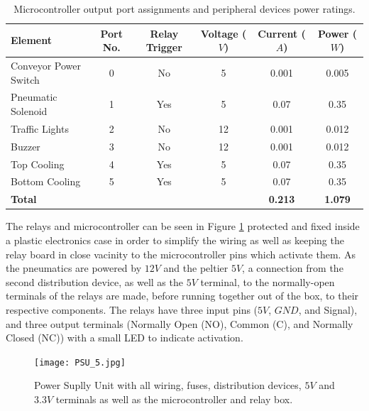 \documentclass[fleqn,twoside]{article}
\begin{document}
\renewcommand{\arraystretch}{0.8}%
\begin{table}[h]
	\caption{Microcontroller output port assignments and peripheral devices power ratings.}
	\label{tab:micro_pinout_out}
	\begin{tabularx}{\linewidth}{Xccccc}
		\toprule
		\textbf{Element}  & \textbf{Port No.}  & \textbf{Relay Trigger} & \textbf{Voltage ($V$)} & \textbf{Current ($A$)} & \textbf{Power ($W$)}\\[8pt]
		\midrule
		Conveyor Power Switch 	& 0 & No & 5 & 0.001 & 0.005 \\[4pt]
		\midrule
		Pneumatic Solenoid 		& 1 & Yes & 5 & 0.07 & 0.35 \\[4pt]
		\midrule
		Traffic Lights 			& 2 & No & 12 & 0.001 & 0.012 \\[4pt]
		\midrule
		Buzzer 					& 3 & No & 12 & 0.001 & 0.012 \\[4pt]
		\midrule
		Top Cooling 			& 4 & Yes & 5 & 0.07 & 0.35 \\[4pt]
		\midrule
		Bottom Cooling 			& 5 & Yes & 5 & 0.07 & 0.35 \\[4pt]
		\midrule
		\textbf{Total} 			&    &     &   & \textbf{0.213} & \textbf{1.079} \\[4pt]
		\bottomrule
		
	\end{tabularx}
\end{table}


The relays and microcontroller can be seen in Figure \ref{fig:PSU_5} protected and fixed inside a plastic electronics case in order to simplify the wiring as well as keeping the relay board in close vacinity to the microcontroller pins which activate them. As the pneumatics are powered by $12V$ and the peltier $5V$, a connection from the second distribution device, as well as the $5V$ terminal, to the normally-open terminals of the relays are made, before running together out of the box, to their respective components. The relays have three input pins ($5V$, $GND$, and Signal), and three output terminals (Normally Open (NO), Common (C), and Normally Closed (NC)) with a small LED to indicate activation. 


\begin{figure}
	\begin{center}
		\texttt{[image: PSU\_5.jpg]}
	\end{center}
	\caption{Power Suplly Unit with all wiring, fuses, distribution devices, $5V$ and $3.3V$ terminals as well as the microcontroller and relay box.}
	\label{fig:PSU_5}
\end{figure}
\end{document}
